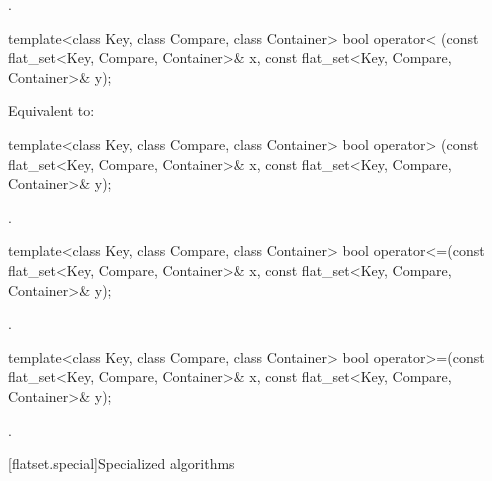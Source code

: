 \begin{codeblock}
\begin{codeblock}
\begin{codeblock}
\begin{addedblock}
\begin{itemdescr}
\pnum \returns {}.
\end{itemdescr}

%
\begin{itemdecl}
template<class Key, class Compare, class Container>
  bool operator< (const flat_set<Key, Compare, Container>& x,
                  const flat_set<Key, Compare, Container>& y);
\end{itemdecl}

\begin{itemdescr}
\pnum
\effects Equivalent to:
\end{itemdescr}

%
\begin{itemdecl}
template<class Key, class Compare, class Container>
  bool operator> (const flat_set<Key, Compare, Container>& x,
                  const flat_set<Key, Compare, Container>& y);
\end{itemdecl}

\begin{itemdescr}
\pnum \returns {}.
\end{itemdescr}

%
\begin{itemdecl}
template<class Key, class Compare, class Container>
  bool operator<=(const flat_set<Key, Compare, Container>& x,
                  const flat_set<Key, Compare, Container>& y);
\end{itemdecl}

\begin{itemdescr}
\pnum \returns {}.
\end{itemdescr}

%
\begin{itemdecl}
template<class Key, class Compare, class Container>
  bool operator>=(const flat_set<Key, Compare, Container>& x,
                  const flat_set<Key, Compare, Container>& y);
\end{itemdecl}

\begin{itemdescr}
\pnum \returns {}.
\end{itemdescr}

[flatset.special]{Specialized algorithms}


\end{addedblock}
\end{codeblock}
\end{codeblock}
\end{codeblock}

